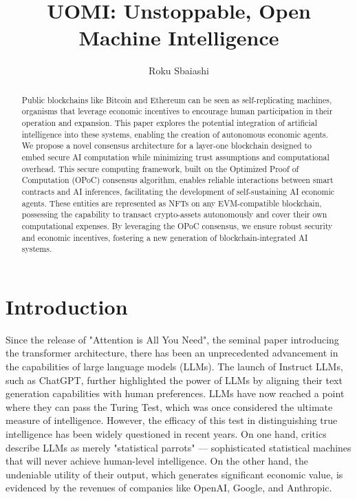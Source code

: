 \documentclass{article}
\title{UOMI: Unstoppable, Open Machine Intelligence}
\author{Roku Sbaiashi}
\begin{document}
\maketitle

\begin{abstract}


Public blockchains like Bitcoin and Ethereum can be seen as self-replicating machines, organisms that leverage economic incentives to encourage human participation in their operation and expansion. This paper explores the potential integration of artificial intelligence into these systems, enabling the creation of autonomous economic agents. We propose a novel consensus architecture for a layer-one blockchain designed to embed secure AI computation while minimizing trust assumptions and computational overhead. This secure computing framework, built on the Optimized Proof of Computation (OPoC) consensus algorithm, enables reliable interactions between smart contracts and AI inferences, facilitating the development of self-sustaining AI economic agents. These entities are represented as NFTs on any EVM-compatible blockchain, possessing the capability to transact crypto-assets autonomously and cover their own computational expenses. By leveraging the OPoC consensus, we ensure robust security and economic incentives, fostering a new generation of blockchain-integrated AI systems.


\end{abstract}


\section{Introduction}

Since the release of "Attention is All You Need", the seminal paper introducing the transformer architecture, there has been an unprecedented advancement in the capabilities of large language models (LLMs). The launch of Instruct LLMs, such as ChatGPT, further highlighted the power of LLMs by aligning their text generation capabilities with human preferences. LLMs have now reached a point where they can pass the Turing Test, which was once considered the ultimate measure of intelligence. However, the efficacy of this test in distinguishing true intelligence has been widely questioned in recent years. On one hand, critics describe LLMs as merely "statistical parrots" — sophisticated statistical machines that will never achieve human-level intelligence. On the other hand, the undeniable utility of their output, which generates significant economic value, is evidenced by the revenues of companies like OpenAI, Google, and Anthropic.
\end{document}
